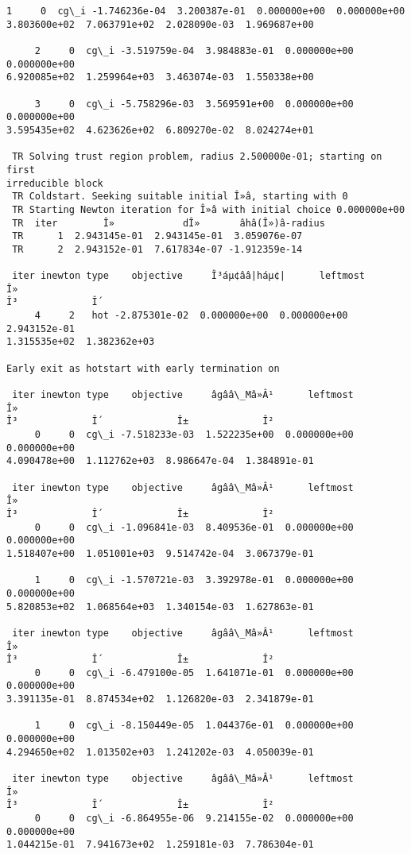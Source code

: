 \begin{Verbatim}[commandchars=\\\{\}]
     1     0  cg\_i -1.746236e-04  3.200387e-01  0.000000e+00  0.000000e+00
3.803600e+02  7.063791e+02  2.028090e-03  1.969687e+00

     2     0  cg\_i -3.519759e-04  3.984883e-01  0.000000e+00  0.000000e+00
6.920085e+02  1.259964e+03  3.463074e-03  1.550338e+00

     3     0  cg\_i -5.758296e-03  3.569591e+00  0.000000e+00  0.000000e+00
3.595435e+02  4.623626e+02  6.809270e-02  8.024274e+01

 TR Solving trust region problem, radius 2.500000e-01; starting on first
irreducible block
 TR Coldstart. Seeking suitable initial Î»â, starting with 0
 TR Starting Newton iteration for Î»â with initial choice 0.000000e+00
 TR  iter        Î»            dÎ»       âhâ(Î»)â-radius
 TR      1  2.943145e-01  2.943145e-01  3.059076e-07
 TR      2  2.943152e-01  7.617834e-07 -1.912359e-14

 iter inewton type    objective     Î³áµ¢ââ|háµ¢|      leftmost         Î»
Î³             Î´
     4     2   hot -2.875301e-02  0.000000e+00  0.000000e+00  2.943152e-01
1.315535e+02  1.382362e+03

Early exit as hotstart with early termination on

 iter inewton type    objective     âgââ\_Mâ»Â¹      leftmost         Î»
Î³             Î´             Î±             Î²
     0     0  cg\_i -7.518233e-03  1.522235e+00  0.000000e+00  0.000000e+00
4.090478e+00  1.112762e+03  8.986647e-04  1.384891e-01

 iter inewton type    objective     âgââ\_Mâ»Â¹      leftmost         Î»
Î³             Î´             Î±             Î²
     0     0  cg\_i -1.096841e-03  8.409536e-01  0.000000e+00  0.000000e+00
1.518407e+00  1.051001e+03  9.514742e-04  3.067379e-01

     1     0  cg\_i -1.570721e-03  3.392978e-01  0.000000e+00  0.000000e+00
5.820853e+02  1.068564e+03  1.340154e-03  1.627863e-01

 iter inewton type    objective     âgââ\_Mâ»Â¹      leftmost         Î»
Î³             Î´             Î±             Î²
     0     0  cg\_i -6.479100e-05  1.641071e-01  0.000000e+00  0.000000e+00
3.391135e-01  8.874534e+02  1.126820e-03  2.341879e-01

     1     0  cg\_i -8.150449e-05  1.044376e-01  0.000000e+00  0.000000e+00
4.294650e+02  1.013502e+03  1.241202e-03  4.050039e-01

 iter inewton type    objective     âgââ\_Mâ»Â¹      leftmost         Î»
Î³             Î´             Î±             Î²
     0     0  cg\_i -6.864955e-06  9.214155e-02  0.000000e+00  0.000000e+00
1.044215e-01  7.941673e+02  1.259181e-03  7.786304e-01


\end{Verbatim}
